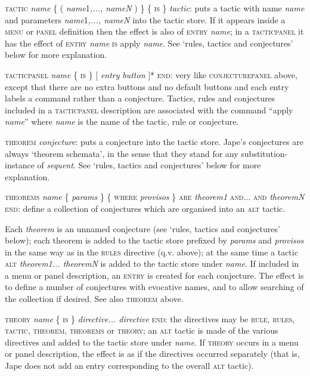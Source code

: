 \documentclass[11pt]{book}
\newcommand{\tab}{\hspace{5mm}}
\begin{document}
\textsc{tactic} \textit{name} \{ ( \textit{name}1\textit{,..., nameN} ) \} \{ \textsc{is \}} \textit{tactic}: puts a tactic with name \textit{name} and parameters \textit{name}1\textit{,..., nameN} into the tactic store. If it appears inside a \textsc{menu} or \textsc{panel} definition then the effect is also of \textsc{entry} \textit{name}; in a \textsc{tacticpanel} it has the effect of \textsc{entry} \textit{name} \textsc{is} apply \textit{name}. See `rules, tactics and conjectures' below for more explanation.


\textsc{tacticpanel} \textit{name} \{ \textsc{is} \} [ \textit{entry} {\textbar} \textit{button} ]* \textsc{end}: very like \textsc{conjecturepanel} above, except that there are no extra buttons and no default buttons and each entry labels a command rather than a conjecture. Tactics, rules and conjectures included in a \textsc{tacticpanel} description are associated with the command ``apply \textit{name}'' where \textit{name} is the name of the tactic, rule or conjecture.


\textsc{theorem} \textit{conjecture}: puts a conjecture into the tactic store. Jape's conjectures are always `theorem schemata', in the sense that they stand for any substitution-instance of \textit{sequent}. See `rules, tactics and conjectures' below for more explanation.


\textsc{theorems} \textit{name} \{ \textit{params} \} \{ \textsc{where} \textit{provisos} \} \textsc{are} \textit{theorem1} \textsc{and}... \textsc{and} \textit{theoremN} \textsc{end}: define a collection of conjectures which are organised into an \textsc{alt} tactic.


\tab Each \textit{theorem} is an unnamed conjecture (see `rules, tactics and conjectures' below); each theorem is added to the tactic store prefixed by \textit{params} and \textit{provisos} in the same way as in the \textsc{rules} directive (q.v. above); at the same time a tactic \textsc{alt} \textit{theorem1... theoremN} is added to the tactic store under \textit{name}. If included in a menu or panel description, an \textsc{entry} is created for each conjecture. The effect is to define a number of conjectures with evocative names, and to allow searching of the collection if desired. See also \textsc{theorem} above.


\textsc{theory} \textit{name} \{ \textsc{is} \} \textit{directive... directive} \textsc{end}: the directives may be \textsc{rule, rules, tactic, theorem, theorems} or \textsc{theory}; an \textsc{alt} tactic is made of the various directives and added to the tactic store under \textit{name}. If \textsc{theory} occurs in a menu or panel description, the effect is as if the directives occurred separately (that is, Jape does not add an entry corresponding to the overall \textsc{alt} tactic).
\end{document}
